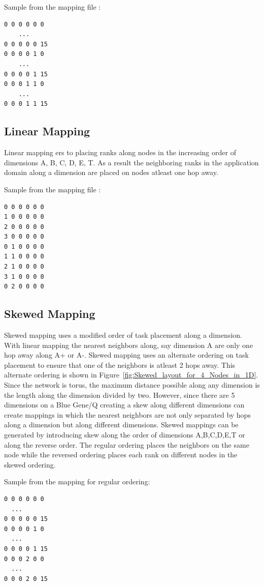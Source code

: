 \documentclass{acm_proc_article-sp}
\begin{document}
Sample from the mapping file :
\begin{lstlisting}[frame=lines, basicstyle=\ttfamily,columns=fixed]
0 0 0 0 0 0
    ...
0 0 0 0 0 15
0 0 0 0 1 0
    ...
0 0 0 0 1 15
0 0 0 1 1 0
    ...
0 0 0 1 1 15
\end{lstlisting}

\subsection{Linear Mapping}
Linear mapping ers to placing ranks along nodes in the increasing order of dimensions A, B, C, D, E, T.
As a result the neighboring ranks in the application domain along a dimension are placed on nodes atleast
one hop away.

Sample from the mapping file :
\begin{lstlisting}[frame=lines, basicstyle=\ttfamily,columns=fixed]
0 0 0 0 0 0
1 0 0 0 0 0
2 0 0 0 0 0
3 0 0 0 0 0
0 1 0 0 0 0
1 1 0 0 0 0
2 1 0 0 0 0
3 1 0 0 0 0
0 2 0 0 0 0
\end{lstlisting}

\subsection{Skewed Mapping}

Skewed mapping uses a modified order of task placement along a dimension.
With linear mapping the nearest neighbors along, say dimension A are only one hop away along A+ or A-.
Skewed mapping uses an alternate ordering on task placement to ensure that one of the neighbors is atleast
2 hops away. This alternate ordering is shown in Figure~\ref{fig:Skewed_layout_for_4_Nodes_in_1D}.
Since the network is torus, the maximum distance possible along any dimension is the length along
the dimension divided by two. However, since there are 5 dimensions on a Blue Gene/Q creating a skew along different
dimensions can create mappings in which the nearest neighbors are not only separated by hops along a dimension but
along different dimensions. Skewed mappings can be generated by introducing skew along the order of dimensions
A,B,C,D,E,T or along the reverse order. The regular ordering places the neighbors on the same node while the reversed
ordering places each rank on different nodes in the skewed ordering.

Sample from the mapping for regular ordering:
\begin{lstlisting}[frame=lines, basicstyle=\ttfamily,columns=fixed]
0 0 0 0 0 0
  ...
0 0 0 0 0 15
0 0 0 0 1 0
  ...
0 0 0 0 1 15
0 0 0 2 0 0
  ...
0 0 0 2 0 15
\end{lstlisting}
\end{document}
